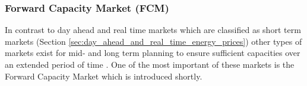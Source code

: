 


%








\subsubsection{Forward Capacity Market (FCM)} 

In contrast to day ahead and real time markets which are classified as short term markets (Section \ref{sec:day_ahead_and_real_time_energy_prices}) other types of markets exist for mid- and long term planning to ensure sufficient capacities over an extended period of time \cite{barroso2005classification,nomikos2010modelling}. One of the most important of these markets is the Forward Capacity Market which is introduced shortly. 

